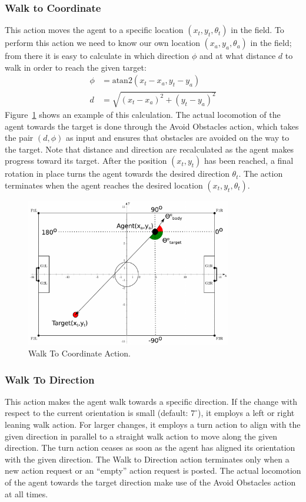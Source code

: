 \subsubsection*{Walk to Coordinate}
This action moves the agent to a specific location $(x_t, y_t, \theta_t)$ in the field. To perform this action we need to know our own location $(x_a, y_a, \theta_a)$ in the field; from there it is easy to calculate in which direction $\phi$ and at what distance $d$ to walk in order to reach the given target:
\begin{align*}
\phi &= \text{atan2}(x_t-x_a,y_t-y_a)\\
d &= \sqrt{(x_t-x_a)^2 + (y_t-y_a)^2}
\end{align*}
Figure~\ref{fig:WalkToCoordinate} shows an example of this calculation. The actual locomotion of the agent towards the target is done through the Avoid Obstacles action, which takes the pair $(d,\phi)$ as input and ensures that obstacles are avoided on the way to the target. Note that distance and direction are recalculated as the agent makes progress toward its target. After the position $(x_t,y_t)$ has been reached, a final rotation in place turns the agent towards the desired direction $\theta_t$. The action terminates when the agent reaches the desired location $(x_t, y_t, \theta_t)$.


 \begin{figure}[t!]
\centering
  \includegraphics[width=0.8\textwidth]{Chapter3/figures/GoToPos.pdf}
  \caption{Walk To Coordinate Action.}
  \label{fig:WalkToCoordinate}
\end{figure}


\subsubsection*{Walk To Direction}
This action makes the agent walk towards a specific direction. If the change with respect to the current orientation is small (default: $7^\circ$), it employs a left or right leaning walk action. For larger changes, it employs a turn action to align with the given direction in parallel to a straight walk action to move along the given direction. The turn action ceases as soon as the agent has aligned its orientation with the given direction. The Walk to Direction action terminates only when a new action request or an ``empty'' action request is posted. The actual locomotion of the agent towards the target direction make use of the Avoid Obstacles action at all times.
 
